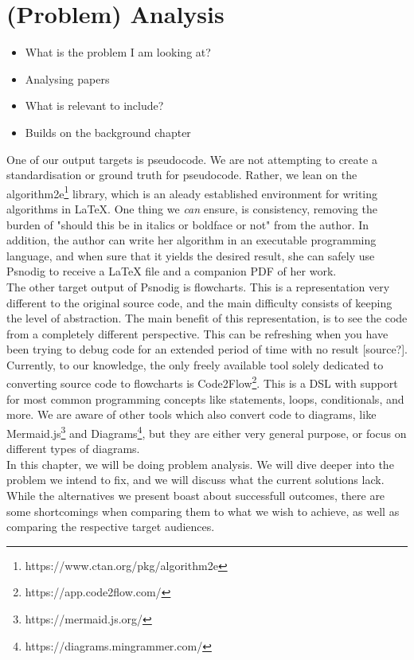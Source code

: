 \chapter{(Problem) Analysis}
\begin{itemize}
    \item What is the problem I am looking at?
    \item Analysing papers
    \item What is relevant to include?
    \item Builds on the background chapter
\end{itemize}

One of our output targets is pseudocode. We are not attempting to create a standardisation or ground truth for pseudocode. Rather, we lean on the algorithm2e\footnote{https://www.ctan.org/pkg/algorithm2e} library, which is an aleady established environment for writing algorithms in LaTeX. One thing we \textit{can} ensure, is consistency, removing the burden of "should this be in italics or boldface or not" from the author. In addition, the author can write her algorithm in an executable programming language, and when sure that it yields the desired result, she can safely use Psnodig to receive a LaTeX file and a companion PDF of her work. \hfill \\

The other target output of Psnodig is flowcharts. This is a representation very different to the original source code, and the main difficulty consists of keeping the level of abstraction. The main benefit of this representation, is to see the code from a completely different perspective. This can be refreshing when you have been trying to debug code for an extended period of time with no result [source?]. \hfill \\

Currently, to our knowledge, the only freely available tool solely dedicated to converting source code to flowcharts is Code2Flow\footnote{https://app.code2flow.com/}. This is a DSL with support for most common programming concepts like statements, loops, conditionals, and more. We are aware of other tools which also convert code to diagrams, like Mermaid.js\footnote{https://mermaid.js.org/} and Diagrams\footnote{https://diagrams.mingrammer.com/}, but they are either very general purpose, or focus on different types of diagrams. \hfill \\

In this chapter, we will be doing problem analysis. We will dive deeper into the problem we intend to fix, and we will discuss what the current solutions lack. While the alternatives we present boast about successfull outcomes, there are some shortcomings when comparing them to what we wish to achieve, as well as comparing the respective target audiences. \hfill \\

